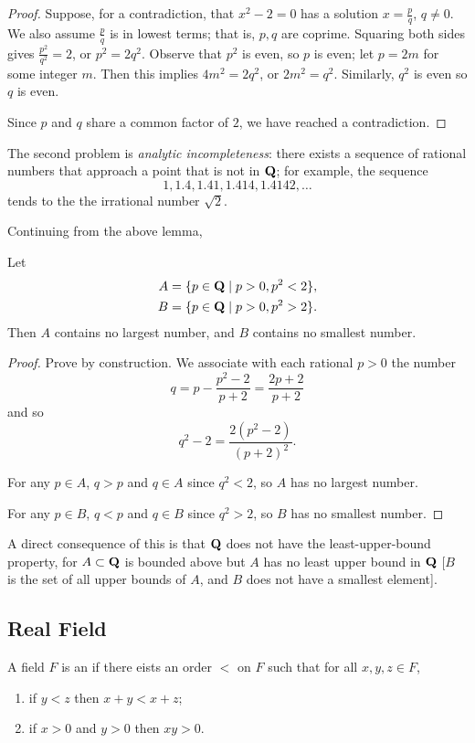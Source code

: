 \begin{proof}
Suppose, for a contradiction, that $x^2-2=0$ has a solution $x=\frac{p}{q}$, $q\neq0$. We also assume $\frac{p}{q}$ is in lowest terms; that is, $p,q$ are coprime. Squaring both sides gives $\frac{p^2}{q^2}=2$, or $p^2=2q^2$. Observe that $p^2$ is even, so $p$ is even; let $p=2m$ for some integer $m$. Then this implies $4m^2=2q^2$, or $2m^2=q^2$. Similarly, $q^2$ is even so $q$ is even.

Since $p$ and $q$ share a common factor of $2$, we have reached a contradiction.
\end{proof}

The second problem is \emph{analytic incompleteness}: there exists a sequence of rational numbers that approach a point that is not in $\mathbf Q$; for example, the sequence
\[1,1.4,1.41,1.414,1.4142,\dots\]
tends to the the irrational number $\sqrt{2}$.

Continuing from the above lemma,
\begin{lemma*}
Let
\begin{align*}
A&=\{p\in\mathbf Q\mid p>0,p^2<2\},\\
B&=\{p\in\mathbf Q\mid p>0,p^2>2\}.
\end{align*}
Then $A$ contains no largest number, and $B$ contains no smallest number.
\end{lemma*}

\begin{proof}
Prove by construction. We associate with each rational $p>0$ the number
\[q=p-\frac{p^2-2}{p+2}=\frac{2p+2}{p+2}\]
and so
\[q^2-2=\frac{2(p^2-2)}{(p+2)^2}.\]

For any $p\in A$, $q>p$ and $q\in A$ since $q^2<2$, so $A$ has no largest number.

For any $p\in B$, $q<p$ and $q\in B$ since $q^2>2$, so $B$ has no smallest number.
\end{proof}

A direct consequence of this is that $\mathbf Q$ does not have the least-upper-bound property, for $A\subset\mathbf Q$ is bounded above but $A$ has no least upper bound in $\mathbf Q$ [$B$ is the set of all upper bounds of $A$, and $B$ does not have a smallest element].

\subsection{Real Field}
\begin{definition}
A field $F$ is an  if there eists an order $<$ on $F$ such that for all $x,y,z\in F$,
\begin{enumerate}[label=(\roman*)]
\item if $y<z$ then $x+y<x+z$;
\item if $x>0$ and $y>0$ then $xy>0$.
\end{enumerate}
\end{definition}

